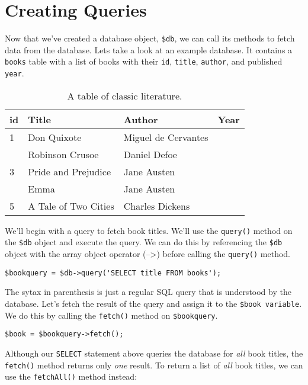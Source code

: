 \documentclass{report}
\begin{document}
\section{Creating Queries}
Now that we've created a database object, \texttt{\$db}, we can call its methods to fetch data from the database.
\bigbreak \noindent
Lets take a look at an example database. It contains a \texttt{books} table with a list of books with their \texttt{id}, \texttt{title}, \texttt{author}, and published \texttt{year}.
\begin{table}[H]
\centering
\renewcommand{\arraystretch}{1.5} %
\setlength{\tabcolsep}{12pt} %
\begin{tabular}{|>{\centering\arraybackslash}m{1cm}|m{5cm}|m{4.5cm}|>{\centering\arraybackslash}m{1.5cm}|}
\hline
\rowcolor{headercolor} 
\textbf{id} & \textbf{Title} & \textbf{Author} & \textbf{Year} \\ \hline
\rowcolor{rowcolor}
1 & Don Quixote & Miguel de Cervantes & 1605 \\ \hline
2 & Robinson Crusoe & Daniel Defoe & 1719 \\ \hline
\rowcolor{rowcolor}
3 & Pride and Prejudice & Jane Austen & 1813 \\ \hline
4 & Emma & Jane Austen & 1816 \\ \hline
\rowcolor{rowcolor}
5 & A Tale of Two Cities & Charles Dickens & 1859 \\ \hline
\end{tabular}
\caption{A table of classic literature.}
\end{table}\noindent
We'll begin with a query to fetch book titles. We'll use the \texttt{query()} method on the \texttt{\$db} object and execute the query. We can do this by referencing the \texttt{\$db} object with the array object operator (--\textgreater) before calling the \texttt{query()} method.
\begin{verbatim}
$bookquery = $db->query('SELECT title FROM books');
\end{verbatim}
The sytax in parenthesis is just a regular SQL query  that is understood by the database.
\bigbreak \noindent
Let's fetch the result of the query and assign it to the \texttt{\$book variable}. We do this by calling the \texttt{fetch()} method on \texttt{\$bookquery}.
\begin{verbatim}
$book = $bookquery->fetch();
\end{verbatim}
Although our \texttt{SELECT} statement above queries the database for \textit{all} book titles, the \texttt{fetch()} method returns only \textit{one} result. To return a list of \textit{all} book titles, we can use the \texttt{fetchAll()} method instead:
\end{document}
